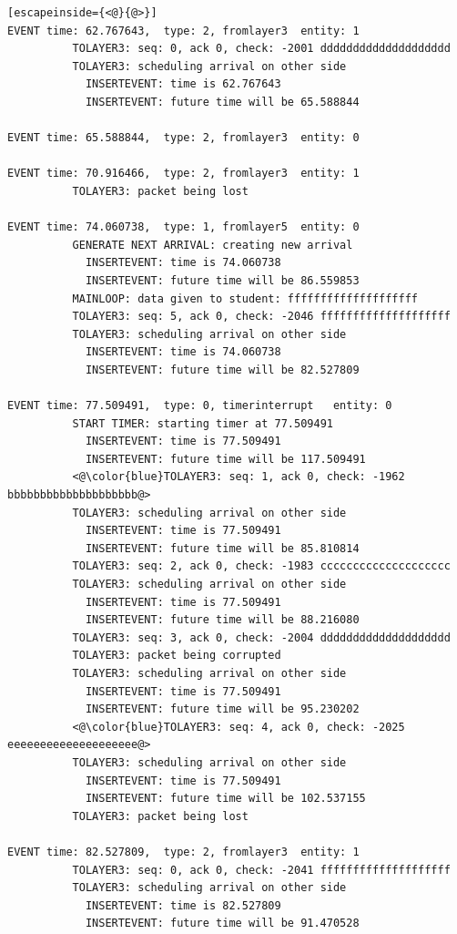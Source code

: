 \documentclass[paper=a4, fontsize=11pt]{scrartcl}
\numberwithin{equation}{section}		%
\numberwithin{figure}{section}			%
\numberwithin{table}{section}				%
\begin{document}
\begin{lstlisting}[escapeinside={<@}{@>}]
EVENT time: 62.767643,  type: 2, fromlayer3  entity: 1
          TOLAYER3: seq: 0, ack 0, check: -2001 dddddddddddddddddddd
          TOLAYER3: scheduling arrival on other side
            INSERTEVENT: time is 62.767643
            INSERTEVENT: future time will be 65.588844

EVENT time: 65.588844,  type: 2, fromlayer3  entity: 0

EVENT time: 70.916466,  type: 2, fromlayer3  entity: 1
          TOLAYER3: packet being lost

EVENT time: 74.060738,  type: 1, fromlayer5  entity: 0
          GENERATE NEXT ARRIVAL: creating new arrival
            INSERTEVENT: time is 74.060738
            INSERTEVENT: future time will be 86.559853
          MAINLOOP: data given to student: ffffffffffffffffffff
          TOLAYER3: seq: 5, ack 0, check: -2046 ffffffffffffffffffff
          TOLAYER3: scheduling arrival on other side
            INSERTEVENT: time is 74.060738
            INSERTEVENT: future time will be 82.527809

EVENT time: 77.509491,  type: 0, timerinterrupt   entity: 0
          START TIMER: starting timer at 77.509491
            INSERTEVENT: time is 77.509491
            INSERTEVENT: future time will be 117.509491
          <@\color{blue}TOLAYER3: seq: 1, ack 0, check: -1962 bbbbbbbbbbbbbbbbbbbb@>
          TOLAYER3: scheduling arrival on other side
            INSERTEVENT: time is 77.509491
            INSERTEVENT: future time will be 85.810814
          TOLAYER3: seq: 2, ack 0, check: -1983 cccccccccccccccccccc
          TOLAYER3: scheduling arrival on other side
            INSERTEVENT: time is 77.509491
            INSERTEVENT: future time will be 88.216080
          TOLAYER3: seq: 3, ack 0, check: -2004 dddddddddddddddddddd
          TOLAYER3: packet being corrupted
          TOLAYER3: scheduling arrival on other side
            INSERTEVENT: time is 77.509491
            INSERTEVENT: future time will be 95.230202
          <@\color{blue}TOLAYER3: seq: 4, ack 0, check: -2025 eeeeeeeeeeeeeeeeeeee@>
          TOLAYER3: scheduling arrival on other side
            INSERTEVENT: time is 77.509491
            INSERTEVENT: future time will be 102.537155
          TOLAYER3: packet being lost

EVENT time: 82.527809,  type: 2, fromlayer3  entity: 1
          TOLAYER3: seq: 0, ack 0, check: -2041 ffffffffffffffffffff
          TOLAYER3: scheduling arrival on other side
            INSERTEVENT: time is 82.527809
            INSERTEVENT: future time will be 91.470528


\end{lstlisting}
\end{document}
